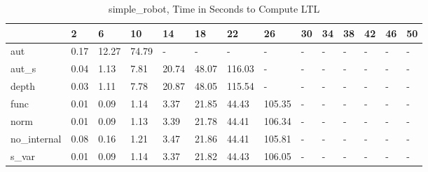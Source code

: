 \begin{table}
\caption{simple_robot, Time in Seconds to Compute LTL}
\label{simple_robot_LTL_time}
\begin{tabular}{llllllllllllll}
\toprule
 & 2 & 6 & 10 & 14 & 18 & 22 & 26 & 30 & 34 & 38 & 42 & 46 & 50 \\
\midrule
aut & 0.17 & 12.27 & 74.79 & - & - & - & - & - & - & - & - & - & - \\
aut_s & 0.04 & 1.13 & 7.81 & 20.74 & 48.07 & 116.03 & - & - & - & - & - & - & - \\
depth & 0.03 & 1.11 & 7.78 & 20.87 & 48.05 & 115.54 & - & - & - & - & - & - & - \\
func & 0.01 & 0.09 & 1.14 & 3.37 & 21.85 & 44.43 & 105.35 & - & - & - & - & - & - \\
norm & 0.01 & 0.09 & 1.13 & 3.39 & 21.78 & 44.41 & 106.34 & - & - & - & - & - & - \\
no_internal & 0.08 & 0.16 & 1.21 & 3.47 & 21.86 & 44.41 & 105.81 & - & - & - & - & - & - \\
s_var & 0.01 & 0.09 & 1.14 & 3.37 & 21.82 & 44.43 & 106.05 & - & - & - & - & - & - \\
\bottomrule
\end{tabular}
\end{table}
